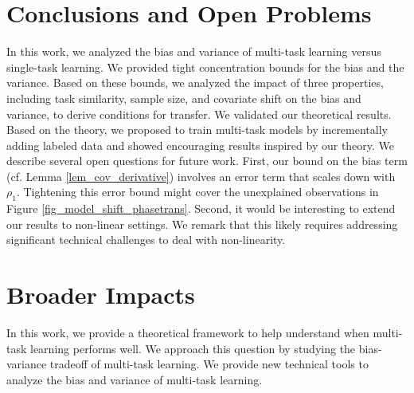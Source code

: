 \vspace{-0.05in}
\section{Conclusions and Open Problems}
\vspace{-0.05in}

In this work, we analyzed the bias and variance of multi-task learning versus single-task learning.
We provided tight concentration bounds for the bias and the variance.
Based on these bounds, we analyzed the impact of three properties, including task similarity, sample size, and covariate shift on the bias and variance, to derive conditions for transfer.
We validated our theoretical results.
Based on the theory, we proposed to train multi-task models by incrementally adding labeled data and showed encouraging results inspired by our theory.
We describe several open questions for future work.
First, our bound on the bias term (cf. Lemma \ref{lem_cov_derivative}) involves an error term that scales down with $\rho_1$.
Tightening this error bound might cover the unexplained observations in Figure \ref{fig_model_shift_phasetrans}.
Second, it would be interesting to extend our results to non-linear settings.
We remark that this likely requires addressing significant technical challenges  to deal with non-linearity.

\newpage
\section*{Broader Impacts}

In this work, we provide a theoretical framework to help understand when multi-task learning performs well.
We approach this question by studying the bias-variance tradeoff of multi-task learning.
We provide new technical tools to analyze the bias and variance of multi-task learning.

